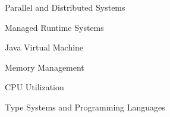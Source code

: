 
\begin{minipage}[t]{.33\linewidth}
  \begin{cvitems}
    \item Parallel and Distributed Systems
    \item Managed Runtime Systems
  \end{cvitems}
\end{minipage}%
%
\hspace{20pt}
%
\begin{minipage}[t]{.33\linewidth}
  \begin{cvitems}
    \item Java Virtual Machine
    \item Memory Management
  \end{cvitems}
\end{minipage}%
%
\hspace{20pt}
%
\begin{minipage}[t]{.33\linewidth}
  \begin{cvitems}
    \item CPU Utilization
    \item Type Systems and
	 Programming Languages
  \end{cvitems}
\end{minipage}%
%

\vspace{15pt}
